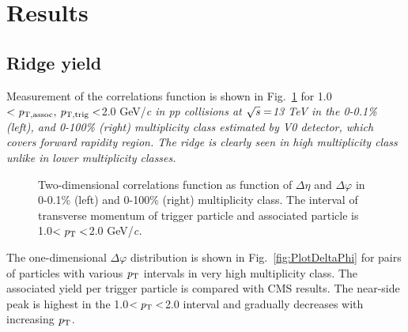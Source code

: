 
\section {Results}
\label{sec:results}

\subsection{Ridge yield}

Measurement of the correlations function is shown in Fig.~\ref{fig:PlotCorrMBHMT} for 1.0$<\it{p}_{\rm{T, assoc}},\,\it{p}_{\rm{T, trig}}<$2.0 GeV/\it{c}\rm{} in pp collisions at $\sqrt{\it{s}} = $\unit{13} {\rm{}TeV} in the 0-0.1\% (left), and 0-100\% (right) multiplicity class estimated by V0 detector, which covers forward rapidity region. The ridge is clearly seen in high multiplicity class unlike in lower multiplicity classes.

\begin{figure}[h!]
	\centering
	\caption{ Two-dimensional correlations function as function of $\Delta\eta$ and $\Delta\varphi$ in 0-0.1\% (left) and 0-100\% (right) multiplicity class. The interval of transverse momentum of trigger particle and associated particle is 1.0$<\it{p}_{\rm{T}}<$2.0 GeV/\it{c}\rm{}. }
	\label{fig:PlotCorrMBHMT}
\end{figure}

The one-dimensional $\Delta\varphi$ distribution is shown in Fig.~\ref{fig:PlotDeltaPhi} for pairs of particles with various $\it{p}_{\rm{T}}$ intervals in very high multiplicity class. The associated yield per trigger particle is compared with CMS results. The near-side peak is highest in the 1.0$<\it{p}_{\rm{T}}<$2.0 interval and gradually decreases with increasing $\it{p}_{\rm{T}}$.

